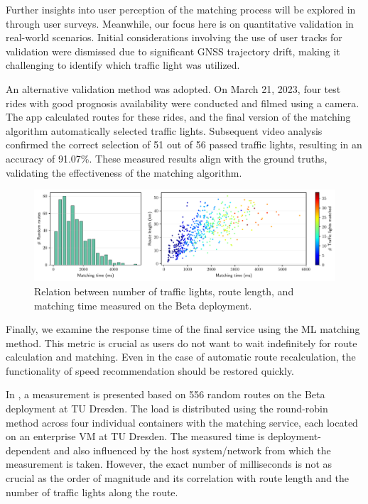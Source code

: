 Further insights into user perception of the matching process will be explored in  through user surveys. Meanwhile, our focus here is on quantitative validation in real-world scenarios. Initial considerations involving the use of user tracks for validation were dismissed due to significant GNSS trajectory drift, making it challenging to identify which traffic light was utilized.

An alternative validation method was adopted. On March 21, 2023, four test rides with good prognosis availability were conducted and filmed using a camera. The app calculated routes for these rides, and the final version of the matching algorithm automatically selected traffic lights. Subsequent video analysis confirmed the correct selection of 51 out of 56 passed traffic lights, resulting in an accuracy of 91.07\%. These measured results align with the ground truths, validating the effectiveness of the matching algorithm.

\begin{figure}[t]
\centering 
\includegraphics[width=\linewidth]{images/matching-performance-556-routes.pdf}
\caption{Relation between number of traffic lights, route length, and matching time measured on the Beta deployment.}
\label{fig:matching-performance}
\end{figure}

Finally, we examine the response time of the final service using the ML matching method. This metric is crucial as users do not want to wait indefinitely for route calculation and matching. Even in the case of automatic route recalculation, the functionality of speed recommendation should be restored quickly.

In , a measurement is presented based on 556 random routes on the Beta deployment at TU Dresden. The load is distributed using the round-robin method across four individual containers with the matching service, each located on an enterprise VM at TU Dresden. The measured time is deployment-dependent and also influenced by the host system/network from which the measurement is taken. However, the exact number of milliseconds is not as crucial as the order of magnitude and its correlation with route length and the number of traffic lights along the route.

